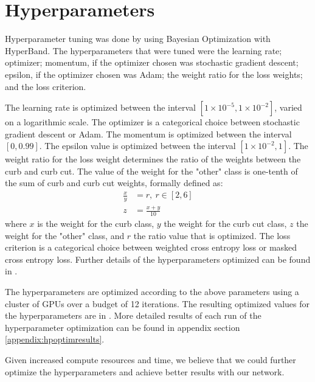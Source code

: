\section{Hyperparameters} \label{section:experiments-hyperparameters}
Hyperparameter tuning was done by using Bayesian Optimization with HyperBand.
The hyperparameters that were tuned were the learning rate; optimizer; momentum, if the optimizer chosen was stochastic gradient descent; epsilon, if the optimizer chosen was Adam; the weight ratio for the loss weights; and the loss criterion.

The learning rate is optimized between the interval $\left[1 \times 10^{-5}, 1 \times 10^{-2}\right]$, varied on a logarithmic scale.
The optimizer is a categorical choice between stochastic gradient descent or Adam.
The momentum is optimized between the interval $\left[0, 0.99\right]$.
The epsilon value is optimized between the interval $\left[1 \times 10^{-2}, 1\right]$.
The weight ratio for the loss weight determines the ratio of the weights between the curb and curb cut.
The value of the weight for the "other" class is one-tenth of the sum of curb and curb cut weights, formally defined as:
\begin{equation}
	\begin{split}
		\frac{x}{y} &= r, ~r \in \left[2, 6\right]\\
		z &= \frac{x + y}{10}
	\end{split}
\end{equation}
where $x$ is the weight for the curb class, $y$ the weight for the curb cut class, $z$ the weight for the "other" class, and $r$ the ratio value that is optimized.
The loss criterion is a categorical choice between weighted cross entropy loss or masked cross entropy loss.
Further details of the hyperparameters optimized can be found in .



The hyperparameters are optimized according to the above parameters using a cluster of  GPUs over a budget of 12 iterations.
The resulting optimized values for the hyperparameters are in .
More detailed results of each run of the hyperparameter optimization can be found in appendix section \ref{appendix:hpoptimresults}.

Given increased compute resources and time, we believe that we could further optimize the hyperparameters and achieve better results with our network.

